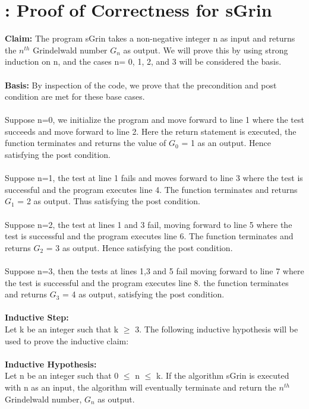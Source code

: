 \documentclass{article}
\begin{document}
    \section{: Proof of Correctness for sGrin}
    \textbf{Claim:} The program sGrin takes a non-negative integer n as input and returns the $n^{th}$ Grindelwald number $G_{n}$ as output. We will prove this by using strong induction on n, and the cases n= 0, 1, 2, and 3 will be considered the basis.
    \\
    \\\textbf{Basis:} By inspection of the code, we prove that the precondition and post condition are met for these base cases.
    \\
    \\Suppose n=0, we initialize the program and move forward to line 1 where the test succeeds and move forward to line 2. Here the return statement is executed, the function terminates and returns the value of $G_{0}$ = 1 as an output. Hence satisfying the post condition.
    \\
    \\Suppose n=1, the test at line 1 fails and moves forward to line 3 where the test is successful and the program executes line 4. The function terminates and returns $G_{1}$  = 2 as output. Thus satisfying the post condition.
    \\
    \\Suppose n=2, the test at lines 1 and 3 fail, moving forward to line 5 where the test is successful and the program executes line 6. The function terminates and returns $G_{2}$ = 3 as output. Hence satisfying the post condition.
    \\
    \\Suppose n=3, then the tests at lines 1,3 and 5 fail moving forward to line 7 where the test is successful and the program executes line 8. the function terminates and returns $G_{3}$ = 4 as output, satisfying the post condition.
    \\
    \\\textbf{Inductive Step:}
    \\Let k be an integer such that k $\geq$ 3. The following inductive hypothesis will be used to prove the inductive claim:
    \\
    \\
    \textbf{Inductive Hypothesis:}
    \\ Let n be an integer such that 0 $\leq$ n $\leq$ k. If the algorithm sGrin is executed with n as an input, the algorithm will eventually terminate and return the $n^{th}$ Grindelwald number, $G_{n}$ as output.
\end{document}
